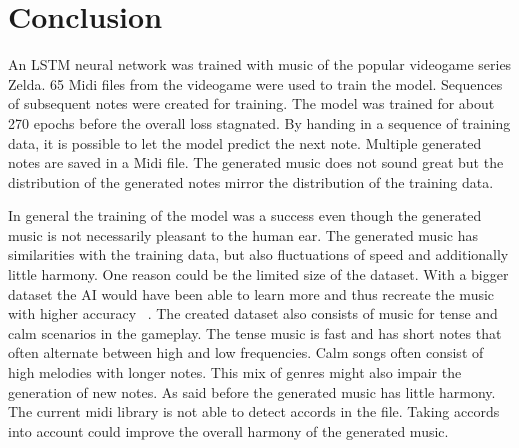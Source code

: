 \section{Conclusion}
\label{conc}

An LSTM neural network was trained with music of the popular videogame series Zelda.
65 Midi files from the videogame were used to train the model. Sequences of subsequent 
notes were created for training. The model was trained for about 270 epochs before the 
overall loss stagnated. By handing in a sequence of training data, it is possible to let
the model predict the next note. Multiple generated notes are saved in a Midi file.
The generated music does not sound great but the distribution of the generated notes
mirror the distribution of the training data.

In general the training of the model was a success even though the generated music is
not necessarily pleasant to the human ear. The generated music has similarities with
the training data, but also fluctuations of speed and additionally little harmony.
One reason could be the limited size of the dataset. With a bigger dataset the AI would
have been able to learn more and thus recreate the music with higher accuracy ~\cite{brownlee_impact_2019}.
The created dataset also consists of music for tense and calm scenarios in the gameplay.
The tense music is fast and has short notes that often alternate between high and low frequencies. 
Calm songs often consist of high melodies with longer notes. This mix of genres might also 
impair the generation of new notes.
As said before the generated music has little harmony. The current midi library is not able 
to detect accords in the file. Taking accords into account could improve the overall harmony
of the generated music. 



